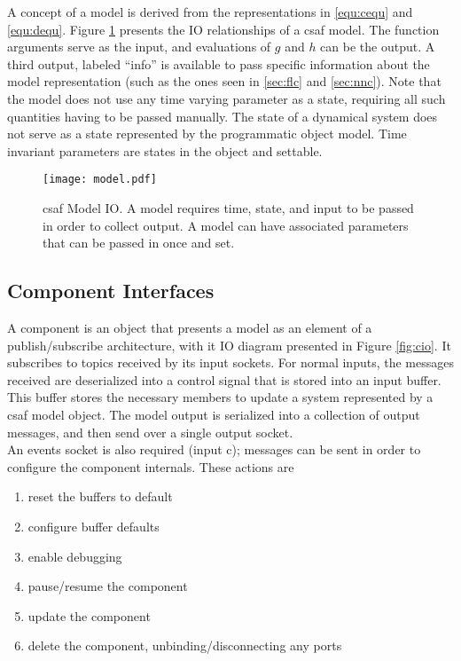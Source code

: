 A concept of a model is derived from the representations in \ref{equ:cequ} and \ref{equ:dequ}. Figure \ref{fig:mio} presents the IO relationships of a \acrshort{csaf} model. The function arguments serve as the input, and evaluations of $g$ and $h$ can be the output.  A third output, labeled ``info'' is available to pass specific information about the model representation (such as the ones seen in \ref{sec:flc} and \ref{sec:nnc}). Note that the model does not use any time varying parameter as a state, requiring all such quantities having to be passed manually. The state of a dynamical system does not serve as a state represented by the programmatic object model. Time invariant parameters are states in the object and settable. 

\begin{figure}
\centering
\texttt{[image: model.pdf]}
\caption{\acrshort{csaf} Model IO. A model requires time, state, and input to be passed in order to collect output. A model can have associated parameters that can be passed in once and set.}
\label{fig:mio}
\end{figure}

\subsection{Component Interfaces}

A component is an object that presents a model as an element of a publish/subscribe architecture, with it IO diagram presented in Figure \ref{fig:cio}. It subscribes to topics received by its input sockets. For normal inputs, the messages received are deserialized into a control signal that is stored into an input buffer. This buffer stores the necessary members to update a system represented by a \acrshort{csaf} model object. The model output is serialized into a collection of output messages, and then send over a single output socket.\\

An events socket is also required (input c); messages can be sent in order to configure the component internals. These actions are

\begin{enumerate}
\item reset the buffers to default
\item configure buffer defaults
\item enable debugging
\item pause/resume the component
\item update the component
\item delete the component, unbinding/disconnecting any ports
\end{enumerate}

